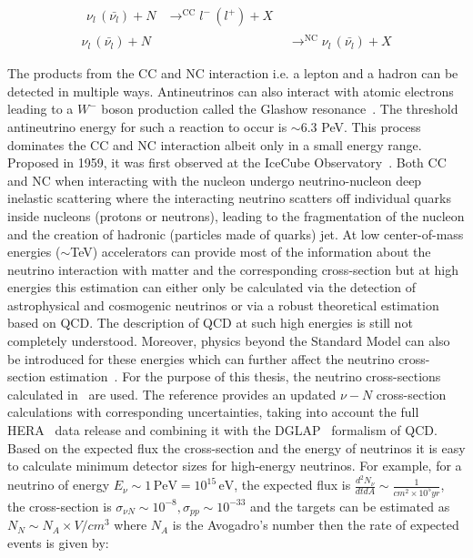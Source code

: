 \begin{subequations}\label{eq:NuCC_NC}
  \begin{align}
    \begin{split}
      \nu_l \, (\bar{\nu_l}) + N &\mathop{\longrightarrow}^{\mathrm{CC}} l^- \, (l^+) + X 
    \end{split} \\
    \nu_l \, (\bar{\nu_l}) + N &\mathop{\longrightarrow}^{\mathrm{NC}} \nu_l \, (\bar{\nu_l}) + X
  \end{align}
\end{subequations}

The products from the CC and NC interaction i.e. a lepton and a hadron can be detected in multiple ways. 
Antineutrinos can also interact with atomic electrons leading to a $W^-$ boson production called the Glashow resonance~\cite{PhysRev.118.316}. The threshold antineutrino energy for such a reaction to occur is $\sim$6.3 PeV. This process dominates the CC and NC interaction albeit only in a small energy range. Proposed in 1959, it was first observed at the IceCube Observatory~\cite{IceCube:2021rpz}. Both CC and NC when interacting with the nucleon undergo neutrino-nucleon deep inelastic scattering where the interacting neutrino scatters off individual quarks inside nucleons (protons or neutrons), leading to the fragmentation of the nucleon and the creation of hadronic (particles made of quarks) jet. At low center-of-mass energies ($\sim$TeV) accelerators can provide most of the information about the neutrino interaction with matter and the corresponding cross-section but at high energies this estimation can either only be calculated via the detection of astrophysical and cosmogenic neutrinos or via a robust theoretical estimation based on \gls{QCD}. The description of \gls*{QCD} at such high energies is still not completely understood. Moreover, physics beyond the Standard Model can also be introduced for these energies which can further affect the neutrino cross-section estimation~\cite{PhysRevD.107.033009}. For the purpose of this thesis, the neutrino cross-sections calculated in~\cite{Cooper_Sarkar_2011} are used. The reference provides an updated $\nu -N$ cross-section calculations with corresponding uncertainties, taking into account the full HERA~\cite{aaron2010combined} data release and combining it with the DGLAP~\cite{ALTARELLI1977298,Dokshitzer:1977sg,Gribov:427157} formalism of QCD. Based on the expected flux the cross-section and the energy of neutrinos it is easy to calculate minimum detector sizes for high-energy neutrinos. For example, for a neutrino of energy $E_{\nu} \sim 1\,\text{PeV} = 10^{15}\,\text{eV}$, the expected flux is $\frac{d^2N_{\nu}}{dt dA} \sim \frac{1}{cm^2 \times 10^5 yr}$, the cross-section is $\sigma_{\nu N} \sim 10^{-8} , \sigma_{pp} \sim 10^{-33}$ and the targets can be estimated as $ N_N \sim N_A \times V/cm^3$ where $N_A$ is the Avogadro's number then the rate of expected events is given by:

